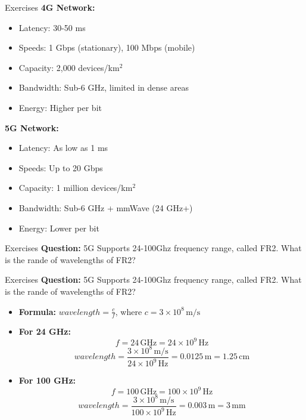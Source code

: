 \documentclass{beamer}
\begin{document}
\begin{frame}{Exercises}
  \textbf{4G Network:}
  \begin{itemize}
    \item Latency: 30-50 ms
    \item Speeds: 1 Gbps (stationary), 100 Mbps (mobile)
    \item Capacity: 2,000 devices/km\(^2\)
    \item Bandwidth: Sub-6 GHz, limited in dense areas
    \item Energy: Higher per bit
  \end{itemize}
  \vspace{0.5cm}
  \textbf{5G Network:}
  \begin{itemize}
    \item Latency: As low as 1 ms
    \item Speeds: Up to 20 Gbps
    \item Capacity: 1 million devices/km\(^2\)
    \item Bandwidth: Sub-6 GHz + mmWave (24 GHz+)
    \item Energy: Lower per bit
  \end{itemize}
\end{frame}

\begin{frame}{Exercises}
  \textbf{Question:} 5G Supports 24-100Ghz frequency range, called FR2. What is the rande of wavelengths of FR2?
\end{frame}


\begin{frame}{Exercises}
  \textbf{Question:} 5G Supports 24-100Ghz frequency range, called FR2. What is the rande of wavelengths of FR2?
  \vspace*{0.75em}
  \begin{itemize}
    \item \textbf{Formula:} \(wavelength = \frac{c}{f}\), where \(c = 3 \times 10^8 \, \text{m/s}\)
    \item \textbf{For 24 GHz:}
    \[
    f = 24 \, \text{GHz} = 24 \times 10^9 \, \text{Hz}
    \]
    \[
      wavelength = \frac{3 \times 10^8 \, \text{m/s}}{24 \times 10^9 \, \text{Hz}} = 0.0125 \, \text{m} = 1.25 \, \text{cm}
    \]
    \item \textbf{For 100 GHz:}
    \[
    f = 100 \, \text{GHz} = 100 \times 10^9 \, \text{Hz}
    \]
    \[
      wavelength = \frac{3 \times 10^8 \, \text{m/s}}{100 \times 10^9 \, \text{Hz}} = 0.003 \, \text{m} = 3 \, \text{mm}
    \]
  \end{itemize}
\end{frame}
\end{document}
